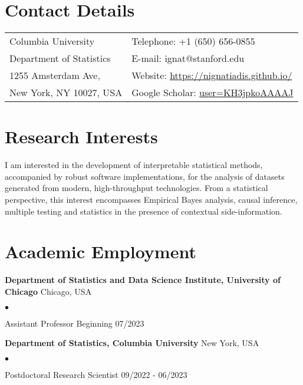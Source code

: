 \documentclass[margin,line]{res}
\newenvironment{list2}{
  \begin{list}{$\bullet$}{%
      \setlength{\itemsep}{0in}
      \setlength{\parsep}{0in} \setlength{\parskip}{0in}
      \setlength{\topsep}{0in} \setlength{\partopsep}{0in}
      \setlength{\leftmargin}{0.2in}}}{\end{list}}
\begin{document}

\begin{resume}
\section{\sc Contact Details}
\vspace{.05in}
\begin{tabular}{@{}p{2in}p{4in}}
Columbia University             & {Telephone:}  +1 (650) 656-0855 \\
Department of Statistics   & {E-mail:}    ignat@stanford.edu \\
1255 Amsterdam Ave, &  {Website:} \href{https://nignatiadis.github.io/}{https://nignatiadis.github.io/}\\
New York, NY 10027, USA  & {Google Scholar:} \href{https://scholar.google.com/citations?user=KH3jpkoAAAAJ}{user=KH3jpkoAAAAJ} \\
\end{tabular}



\section{\sc Research Interests}
I am interested in the development of interpretable statistical methods, accompanied by robust software implementations, for the analysis of datasets generated from modern, high-throughput technologies. From a statistical perspective, this interest encompasses Empirical Bayes analysis, causal inference, multiple testing and statistics in the presence of contextual side-information.

\section{\sc Academic Employment}
{\bf Department of Statistics and Data Science Institute, University of Chicago} \hfill Chicago, USA\\
\vspace*{-.14in}
\begin{list2}
\item Assistant Professor \hfill Beginning 07/2023
\end{list2}

{\bf Department of Statistics, Columbia University} \hfill New York, USA\\
\vspace*{-.14in}
\begin{list2}
\item Postdoctoral Research Scientist \hfill 09/2022 - 06/2023
\end{list2}




\end{resume}
\end{document}
